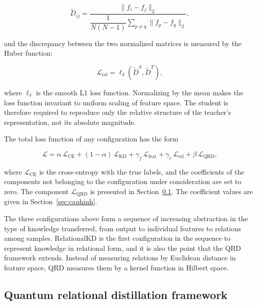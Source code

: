 \begin{equation}
\label{eq:pdist}
\tilde{D}_{ij} = \frac{\|f_i - f_j\|_2}
  {\dfrac{1}{N(N-1)}\displaystyle\sum_{p \neq q} \|f_p - f_q\|_2},
\end{equation}

and the discrepancy between the two normalized matrices is measured
by the Huber function:

\begin{equation}
\label{eq:rkd}
\mathcal{L}_{\mathrm{rel}} = \ell_{\delta}\!\left(
  \tilde{D}^{S}, \tilde{D}^{T} \right),
\end{equation}

where $\ell_{\delta}$ is the smooth L1 loss function. Normalizing by the mean makes the loss function invariant to uniform scaling of feature space. The student is therefore required to reproduce only the relative structure of the teacher's representation, not its absolute magnitude.

The total loss function of any configuration has the form

\begin{equation}
\label{eq:total}
\mathcal{L} = \alpha\,\mathcal{L}_{\mathrm{CE}}
  + (1-\alpha)\,\mathcal{L}_{\mathrm{KD}}
  + \gamma_{f}\,\mathcal{L}_{\mathrm{feat}}
  + \gamma_{r}\,\mathcal{L}_{\mathrm{rel}}
  + \beta\,\mathcal{L}_{\mathrm{QRD}},
\end{equation}

where $\mathcal{L}_{\mathrm{CE}}$ is the cross-entropy with the true
labels, and the coefficients of the components not belonging to the
configuration under consideration are set to zero. The component
$\mathcal{L}_{\mathrm{QRD}}$ is presented in Section~\ref{sec:qrd}.
The coefficient values are given in Section~\ref{sec:cauhinh}.

The three configurations above form a sequence of increasing
abstraction in the type of knowledge transferred, from output to
individual features to relations among samples. RelationalKD is the
first configuration in the sequence to represent knowledge in
relational form, and it is also the point that the QRD framework
extends. Instead of measuring relations by Euclidean distance in
feature space, QRD measures them by a kernel function in Hilbert
space.

\subsection{Quantum relational distillation framework}
\label{sec:qrd}

